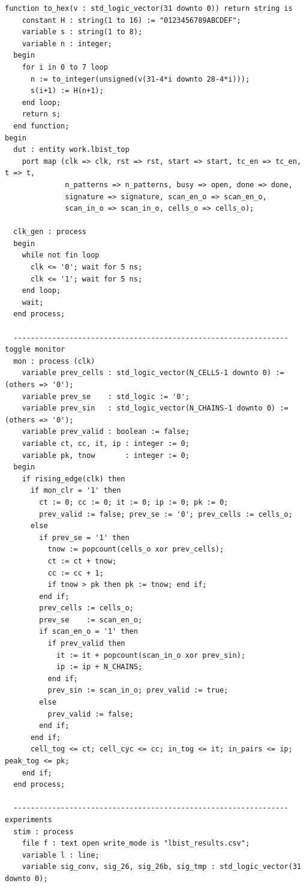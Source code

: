 \documentclass[conference]{IEEEtran}
\begin{document}
\begin{lstlisting}[style=vhdlstyle, caption={LBIST Sweeping Simulation Testbench (\texttt{tb\_lbist.vhd})}]
  function to_hex(v : std_logic_vector(31 downto 0)) return string is
    constant H : string(1 to 16) := "0123456789ABCDEF";
    variable s : string(1 to 8);
    variable n : integer;
  begin
    for i in 0 to 7 loop
      n := to_integer(unsigned(v(31-4*i downto 28-4*i)));
      s(i+1) := H(n+1);
    end loop;
    return s;
  end function;
begin
  dut : entity work.lbist_top
    port map (clk => clk, rst => rst, start => start, tc_en => tc_en, t => t,
              n_patterns => n_patterns, busy => open, done => done,
              signature => signature, scan_en_o => scan_en_o,
              scan_in_o => scan_in_o, cells_o => cells_o);

  clk_gen : process
  begin
    while not fin loop
      clk <= '0'; wait for 5 ns;
      clk <= '1'; wait for 5 ns;
    end loop;
    wait;
  end process;

  ---------------------------------------------------------------- toggle monitor
  mon : process (clk)
    variable prev_cells : std_logic_vector(N_CELLS-1 downto 0) := (others => '0');
    variable prev_se    : std_logic := '0';
    variable prev_sin   : std_logic_vector(N_CHAINS-1 downto 0) := (others => '0');
    variable prev_valid : boolean := false;
    variable ct, cc, it, ip : integer := 0;
    variable pk, tnow       : integer := 0;
  begin
    if rising_edge(clk) then
      if mon_clr = '1' then
        ct := 0; cc := 0; it := 0; ip := 0; pk := 0;
        prev_valid := false; prev_se := '0'; prev_cells := cells_o;
      else
        if prev_se = '1' then
          tnow := popcount(cells_o xor prev_cells);
          ct := ct + tnow;
          cc := cc + 1;
          if tnow > pk then pk := tnow; end if;
        end if;
        prev_cells := cells_o;
        prev_se    := scan_en_o;
        if scan_en_o = '1' then
          if prev_valid then
            it := it + popcount(scan_in_o xor prev_sin);
            ip := ip + N_CHAINS;
          end if;
          prev_sin := scan_in_o; prev_valid := true;
        else
          prev_valid := false;
        end if;
      end if;
      cell_tog <= ct; cell_cyc <= cc; in_tog <= it; in_pairs <= ip; peak_tog <= pk;
    end if;
  end process;

  ---------------------------------------------------------------- experiments
  stim : process
    file f : text open write_mode is "lbist_results.csv";
    variable l : line;
    variable sig_conv, sig_26, sig_26b, sig_tmp : std_logic_vector(31 downto 0);


\end{lstlisting}
\end{document}
